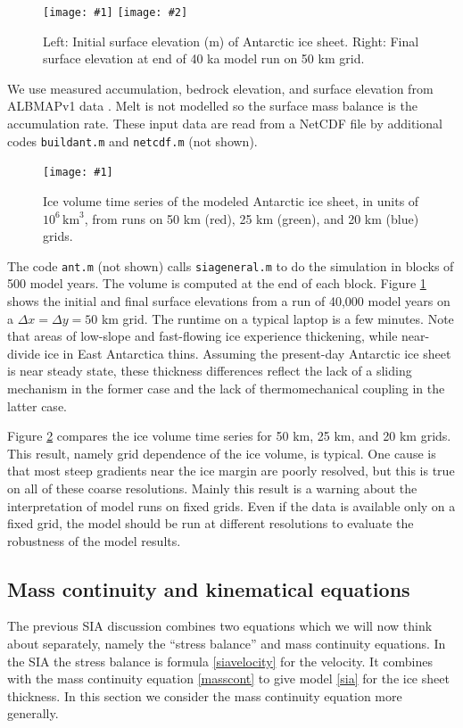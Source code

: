 \documentclass[letterpaper,final,12pt,reqno]{amsart}
\newcommand{\onefigsize}[3]{
\begin{figure}[ht]
\centering
\texttt{[image: \#1]}
\caption{#2}
\label{fig:#1}
\end{figure}}
\newcommand{\onefig}[2]{\onefigsize{#1}{#2}{3.0in}}
\newcommand{\twofigsizes}[5]{
\begin{figure}[ht]
\centering
\texttt{[image: \#1]} \quad
\texttt{[image: \#2]}
\caption{#3}
\label{fig:#1}
\end{figure}}
\begin{document}
\twofigsizes{antinitial}{antfinal}{Left: Initial surface elevation (m) of Antarctic ice sheet.  Right: Final surface elevation at end of 40 ka model run on 50 km grid.}{2.55in}{3.2in}

We use measured accumulation, bedrock elevation, and surface elevation from ALBMAPv1 data \cite{LeBrocqetal2010}.  Melt is not modelled so the surface mass balance is the accumulation rate.  These input data are read from a NetCDF file by additional codes \texttt{buildant.m} and \texttt{netcdf.m} (not shown).

\onefig{antvolcompare}{Ice volume time series of the modeled Antarctic ice sheet, in units of $10^6 \, \text{km}^3$, from runs on 50 km (red), 25 km (green), and 20 km (blue) grids.}

The code \texttt{ant.m} (not shown) calls \texttt{siageneral.m} to do the simulation in blocks of 500 model years.  The volume is computed at the end of each block.  Figure \ref{fig:antinitial} shows the initial and final surface elevations from a run of 40,000 model years on a $\Delta x = \Delta y = 50$ km grid.  The runtime on a typical laptop is a few minutes.  Note that areas of low-slope and fast-flowing ice experience thickening, while near-divide ice in East Antarctica thins.  Assuming the present-day Antarctic ice sheet is near steady state, these thickness differences reflect the lack of a sliding mechanism in the former case and the lack of thermomechanical coupling in the latter case.

Figure \ref{fig:antvolcompare} compares the ice volume time series for 50 km, 25 km, and 20 km grids.  This result, namely grid dependence of the ice volume, is typical.  One cause is that most steep gradients near the ice margin are poorly resolved, but this is true on all of these coarse resolutions.  Mainly this result is a warning about the interpretation of model runs on fixed grids.  Even if the data is available only on a fixed grid, the model should be run at different resolutions to evaluate the robustness of the model results.


\subsection{Mass continuity and kinematical equations}

The previous SIA discussion combines two equations which we will now think about separately, namely the ``stress balance'' and mass continuity equations.  In the SIA the stress balance is formula \eqref{siavelocity} for the velocity.  It combines with the mass continuity equation \eqref{masscont} to give model \eqref{sia} for the ice sheet thickness.  In this section we consider the mass continuity equation more generally.
\end{document}
